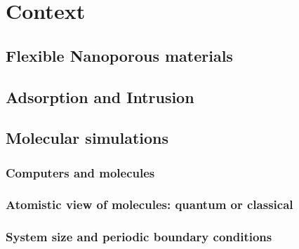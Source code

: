 \documentclass[thesis]{subfiles}
\begin{document}
\chapter{Context}
\startcontents[chapters]
\printpartialtoc

\section{Flexible Nanoporous materials}

\section{Adsorption and Intrusion}

\section{Molecular simulations}

\subsection{Computers and molecules}

\subsection{Atomistic view of molecules: quantum or classical}

\subsection{System size and periodic boundary conditions}
\end{document}
